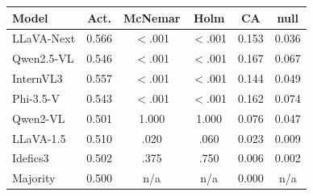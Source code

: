\footnotesize
\setlength{\tabcolsep}{2.6pt}
\begin{tabular}{@{}lccccc@{}}
\toprule
Model & Act. & McNemar & Holm & CA & null \\
\midrule
LLaVA-Next & 0.566 & $<$.001 & $<$.001 & 0.153 & 0.036 \\
Qwen2.5-VL & 0.546 & $<$.001 & $<$.001 & 0.167 & 0.067 \\
InternVL3 & 0.557 & $<$.001 & $<$.001 & 0.144 & 0.049 \\
Phi-3.5-V & 0.543 & $<$.001 & $<$.001 & 0.162 & 0.074 \\
Qwen2-VL & 0.501 & 1.000 & 1.000 & 0.076 & 0.047 \\
LLaVA-1.5 & 0.510 & .020 & .060 & 0.023 & 0.009 \\
Idefics3 & 0.502 & .375 & .750 & 0.006 & 0.002 \\
\midrule
Majority & 0.500 & n/a & n/a & 0.000 & n/a \\
\bottomrule
\end{tabular}

